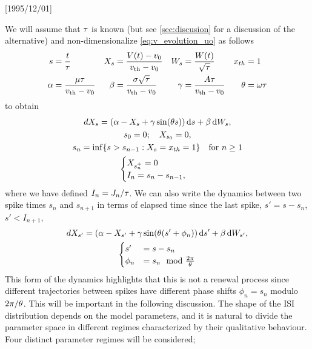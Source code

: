 \NeedsTeXFormat{LaTeX2e}[1995/12/01] \documentclass[10pt]{bmc_article}
\newenvironment{bmcformat}{\begin{raggedright}\baselineskip20pt\sloppy\setboolean{publ}{false}}{\end{raggedright}\baselineskip20pt\sloppy}
\begin{document}
\begin{bmcformat}
We will assume that ${\tau}$ is known (but see \cref{sec:discusion} for a discussion
of the alternative) and non-dimensionalize \cref{eq:v_evolution_uo} as follows
\begin{align*}
s &= \frac{t}{{\tau}}	& 
X_s &= \frac{V(t) - v_0}{{ v_{\textrm{th} } } - v_0}&
W_s &= \frac{W(t)}{\sqrt {{\tau}}}	&
{ x_{th} }&= 1
\\
{\alpha} &= \frac{{\mu } {\tau}}{{ v_{\textrm{th} } } - v_0}	&
{\beta} &= \frac{{\sigma }\sqrt{{\tau}}}{{ v_{\textrm{th} } }-v_0}	&
{\gamma } &= \frac{A {\tau}}{ { v_{\textrm{th} } } - v_0 }	&
{\theta} &= {\omega} {\tau} \notag
\end{align*}
to obtain
\begin{equation}
\begin{gathered}
dX_s = ({\alpha} - X_s + {\gamma } \sin( {\theta} s ) ) \, \mathrm{d} s + {\beta} \, \mathrm{d} W_s,
\\
s_0 = 0; \quad X_{s_0} = 0,
\\
s_{n } = \inf \{ s > s_{n-1} : X_s = { x_{th} } =1 \} \quad \text{for } n \geq 1 
\\
\begin{cases}
X_{s_n^+} = 0 &  
\\
I_n = s_n-s_{n-1} ,
\end{cases}
\end{gathered}
\label{eq:X_evolution_uo}
\end{equation}
where we have defined $I_n = J_n / {\tau}$. We can also write the dynamics between two spike times $s_n$ and $s_{n+1}$ in terms of elapsed time since
the last spike, $s' = s- s_n$, $s' < I_{n+1}$,
\begin{equation}
\begin{gathered}
dX_{s'} = ({\alpha} - X_{s'} + {\gamma } \sin( {\theta} (s' + \phi_n ) ) \, \mathrm{d} s' + {\beta}
\, \mathrm{d} W_{s'},
\\
\begin{cases}
s' &= s - s_n
\\
 \phi_n &= s_n \mod \tfrac{2 \pi}{{\theta}}
\end{cases}
\end{gathered}
\label{eq:X_evolution_uo_renewal}
\end{equation}
This form of the dynamics highlights that this is not a renewal process since
different trajectories between spikes have different phase shifts $\phi_n = s_n$
modulo ${2 \pi}/{{\theta}}$. This will be important in the following discussion. The
shape of the ISI distribution depends on the model parameters, and it is natural
to divide the parameter space in different regimes characterized by their
qualitative behaviour. Four distinct parameter regimes will be considered;

\end{bmcformat}
\end{document}
